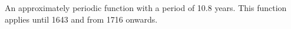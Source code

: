An approximately periodic function with a period of 10.8 years. This function applies until 1643 and from 1716 onwards.